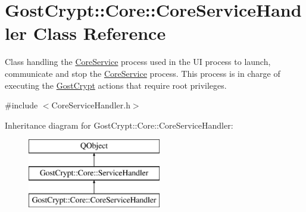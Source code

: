 \hypertarget{class_gost_crypt_1_1_core_1_1_core_service_handler}{}\section{Gost\+Crypt\+:\+:Core\+:\+:Core\+Service\+Handler Class Reference}
\label{class_gost_crypt_1_1_core_1_1_core_service_handler}


Class handling the \hyperlink{class_gost_crypt_1_1_core_1_1_core_service}{Core\+Service} process used in the UI process to launch, communicate and stop the \hyperlink{class_gost_crypt_1_1_core_1_1_core_service}{Core\+Service} process. This process is in charge of executing the \hyperlink{namespace_gost_crypt}{Gost\+Crypt} actions that require root privileges.  




{\ttfamily \#include $<$Core\+Service\+Handler.\+h$>$}

Inheritance diagram for Gost\+Crypt\+:\+:Core\+:\+:Core\+Service\+Handler\+:\begin{figure}[H]
\begin{center}
\leavevmode
\includegraphics[height=3.000000cm]{class_gost_crypt_1_1_core_1_1_core_service_handler}
\end{center}
\end{figure}
